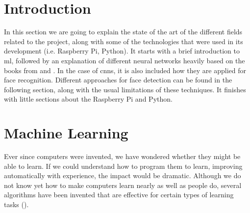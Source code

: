 
\section{Introduction}
In this section we are going to explain the state of the art of the different fields related to the project, along with some of the technologies that were used in its development (i.e. Raspberry Pi, Python). It starts with a brief introduction to \gls{ml}, followed by an explanation of different neural networks heavily based on the books from \cite{mitchell1997} and \cite{haykin2009neural}. In the case of \glspl{cnn}, it is also included how they are applied for face recognition. Different approaches for face detection can be found in the following section, along with the usual limitations of these techniques. It finishes with little sections about the Raspberry Pi and Python. 


\section{Machine Learning}
Ever since computers were invented, we have wondered whether they might be able to learn. If we could understand how to program them to learn, improving automatically with experience, the impact would be dramatic. Although we do not know yet how to make computers learn nearly as well as people do, several algorithms have been invented that are effective for certain types of learning tasks (\cite{mitchell1997}).  

